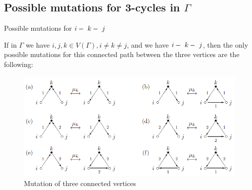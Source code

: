 \documentclass{beamer}
\begin{document}
\subsection{Possible mutations for 3-cycles in $\Gamma$}

\begin{frame}{Possible mutations for $i\--\ k\--\ j$}
\begin{corollary}
If in $\Gamma$ we have $i,j,k \in V(\Gamma), i \neq k \neq j$, and we have $i\--\ k\--\ j$, then the only possible mutations for this connected path between the three vertices are the following:
\begin{figure}[h]
\centering
\includegraphics[scale = .40]{mutation3path.PNG}
\caption{Mutation of three connected vertices}
\end{figure}
\end{corollary}
\end{frame}
\end{document}
